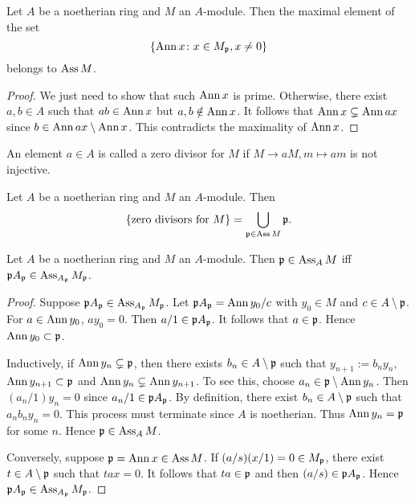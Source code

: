     \begin{lemma}\label{lem: maximal Ann(x) is prime}
        Let $A$ be a noetherian ring and $M$ an $A$-module.
        Then the maximal element of the set 
        \[ \{ \operatorname{Ann} x \colon x \in M_{\mathfrak{p}}, x \neq 0 \} \]
        belongs to $\operatorname{Ass} M$.
    \end{lemma}
    \begin{proof}
        We just need to show that such $\operatorname{Ann} x$ is prime.
        Otherwise, there exist $a,b \in A$ such that $ab \in \operatorname{Ann} x$ but $a,b \notin \operatorname{Ann} x$.
        It follows that $\operatorname{Ann} x \subsetneq \operatorname{Ann} ax$ since $b \in \operatorname{Ann} ax \setminus \operatorname{Ann} x$.
        This contradicts the maximality of $\operatorname{Ann} x$.
    \end{proof}

    An element $a \in A$ is called a zero divisor for $M$ if $M \to aM, m\mapsto am$ is not injective.

    \begin{corollary}\label{cor: zero divisors and associated prime ideals}
        Let $A$ be a noetherian ring and $M$ an $A$-module.
        Then 
        \[ \{\text{zero divisors for } M \} = \bigcup_{{\mathfrak{p}} \in \operatorname{Ass} M} {\mathfrak{p}}. \]
    \end{corollary}

    \begin{lemma}\label{lem: associated set is stable under localization}
        Let $A$ be a noetherian ring and $M$ an $A$-module.
        Then ${\mathfrak{p}} \in \operatorname{Ass}_A M$ iff ${\mathfrak{p}} A_{\mathfrak{p}} \in \operatorname{Ass}_{A_{\mathfrak{p}}} M_{\mathfrak{p}}$.
    \end{lemma}
    \begin{proof}
        Suppose ${\mathfrak{p}} A_{\mathfrak{p}}\in \operatorname{Ass}_{A_{\mathfrak{p}}} M_{\mathfrak{p}}$.
        Let ${\mathfrak{p}} A_{\mathfrak{p}} = \operatorname{Ann} y_0/c$ with $y_0 \in M$ and $c \in A \setminus {\mathfrak{p}}$.
        For $a \in \operatorname{Ann} y_0$, $ay_0 = 0$.
        Then $a/1 \in {\mathfrak{p}} A_{\mathfrak{p}}$.
        It follows that $a \in {\mathfrak{p}}$.
        Hence $\operatorname{Ann} y_0 \subset {\mathfrak{p}}$.

        Inductively, if $\operatorname{Ann} y_n \subsetneq {\mathfrak{p}}$, then there exists $b_{n} \in A \setminus {\mathfrak{p}}$ 
        such that $y_{n+1}:=b_ny_n$, $\operatorname{Ann} y_{n+1} \subset {\mathfrak{p}}$ and $\operatorname{Ann} y_n \subsetneq \operatorname{Ann} y_{n+1}$.
        To see this, choose $a_n \in {\mathfrak{p}}\setminus \operatorname{Ann} y_n$.
        Then $(a_n/1) y_n = 0$ since $a_n/1 \in {\mathfrak{p}} A_{\mathfrak{p}}$.
        By definition, there exist $b_n \in A \setminus {\mathfrak{p}}$ such that $a_nb_ny_n = 0$.
        This process must terminate since $A$ is noetherian.
        Thus $\operatorname{Ann} y_n = {\mathfrak{p}}$ for some $n$.
        Hence ${\mathfrak{p}} \in \operatorname{Ass}_A M$. 

        Conversely, suppose ${\mathfrak{p}} = \operatorname{Ann} x \in \operatorname{Ass} M$.
        If $(a/s)(x/1) = 0 \in M_{\mathfrak{p}}$, there exist $t \in A \setminus {\mathfrak{p}}$ such that $tax = 0$.
        It follows that $ta \in {\mathfrak{p}}$ and then $(a/s) \in {\mathfrak{p}} A_{\mathfrak{p}}$.
        Hence ${\mathfrak{p}} A_{\mathfrak{p}} \in \operatorname{Ass}_{A_{\mathfrak{p}}} M_{\mathfrak{p}}$.
    \end{proof}

